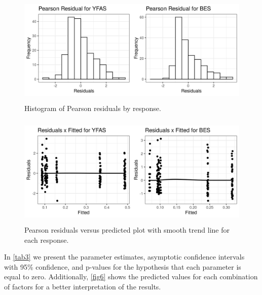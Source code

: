 \documentclass[USenglish]{article}
\theoremstyle{dgthm}
\theoremstyle{dgdef}
\begin{document}
\begin{figure}[H]
\centering
\includegraphics[width=29.4pc,height=12.6pc]{FIGURES/FIGURE4.jpeg}
\caption{Histogram of Pearson residuals by response.\label{fig4}}
\end{figure}

\begin{figure}[H]
\centering
\includegraphics[width=29.4pc,height=12.6pc]{FIGURES/FIGURE5.jpeg}
\caption{Pearson residuals versus predicted plot with smooth trend line for each response.\label{fig5}}
\end{figure}

In \autoref{tab3} we present the parameter estimates, asymptotic confidence intervals with 95\% confidence, and p-values for the hypothesis that each parameter is equal to zero. Additionally, \autoref{fig6} shows the predicted values for each combination of factors for a better interpretation of the results.
\end{document}
